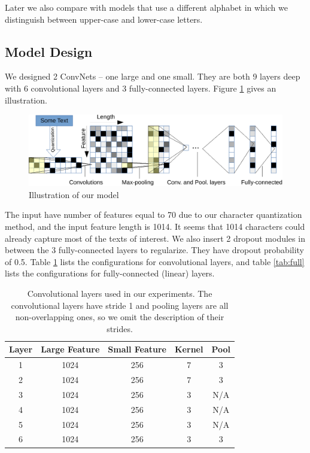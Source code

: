 \documentclass{article} %
\begin{document}
Later we also compare with models that use a different alphabet in which we distinguish between upper-case and lower-case letters.

\subsection{Model Design}

We designed 2 ConvNets -- one large and one small. They are both 9 layers deep with 6 convolutional layers and 3 fully-connected layers. Figure \ref{fig:modl} gives an illustration.

\begin{figure}[ht]
  \centering
  \includegraphics[width=0.8\columnwidth]{model}
  \caption{Illustration of our model}
  \label{fig:modl}
\end{figure}

The input have number of features equal to 70 due to our character quantization method, and the input feature length is 1014. It seems that 1014 characters could already capture most of the texts of interest. We also insert 2 dropout\cite{HSKSS12} modules in between the 3 fully-connected layers to regularize. They have dropout probability of 0.5. Table \ref{tab:conv} lists the configurations for convolutional layers, and table \ref{tab:full} lists the configurations for fully-connected (linear) layers.

\begin{table}[ht]
  \caption{Convolutional layers used in our experiments. The convolutional layers have stride 1 and pooling layers are all non-overlapping ones, so we omit the description of their strides.}
  \label{tab:conv}
  \begin{center}
    \begin{tabular}{ccccc}
      Layer & Large Feature & Small Feature & Kernel & Pool \\
      \hline
      1 & 1024 & 256 & 7 & 3 \\
      2 & 1024 & 256 & 7 & 3 \\
      3 & 1024 & 256 & 3 & N/A \\
      4 & 1024 & 256 & 3 & N/A \\
      5 & 1024 & 256 & 3 & N/A \\
      6 & 1024 & 256 & 3 & 3 \\
    \end{tabular}
  \end{center}
\end{table}
\end{document}
